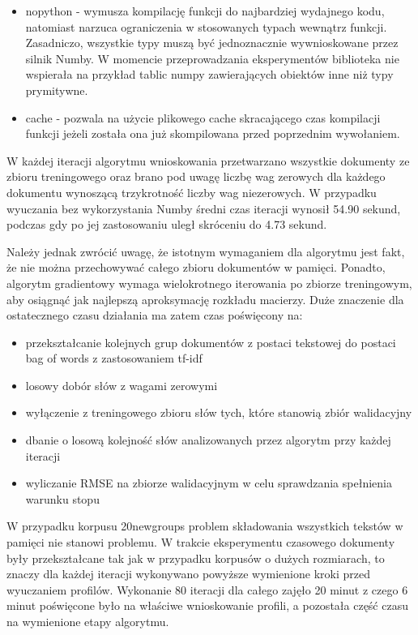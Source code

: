 \documentclass{pracamgr}
\begin{document}
\begin{itemize}
    \item nopython - wymusza kompilację funkcji do najbardziej wydajnego kodu, natomiast narzuca ograniczenia w stosowanych typach wewnątrz funkcji. Zasadniczo, wszystkie typy muszą być jednoznacznie wywnioskowane przez silnik Numby. W momencie przeprowadzania eksperymentów biblioteka nie wspierała na przykład tablic numpy zawierających obiektów inne niż typy prymitywne.
    \item cache - pozwala na użycie plikowego cache skracającego czas kompilacji funkcji jeżeli została ona już skompilowana przed poprzednim wywołaniem.
\end{itemize}

W każdej iteracji algorytmu wnioskowania przetwarzano wszystkie dokumenty ze zbioru treningowego oraz brano pod uwagę liczbę wag zerowych dla każdego dokumentu wynoszącą trzykrotność liczby wag niezerowych. W przypadku wyuczania bez wykorzystania Numby średni czas iteracji wynosił 54.90 sekund, podczas gdy po jej zastosowaniu uległ skróceniu do 4.73 sekund.

Należy jednak zwrócić uwagę, że istotnym wymaganiem dla algorytmu jest fakt, że nie można przechowywać całego zbioru dokumentów w pamięci. Ponadto, algorytm gradientowy wymaga wielokrotnego iterowania po zbiorze treningowym, aby osiągnąć jak najlepszą aproksymację rozkładu macierzy. Duże znaczenie dla ostatecznego czasu działania ma zatem czas poświęcony na:

\begin{itemize}
    \item przekształcanie kolejnych grup dokumentów z postaci tekstowej do postaci bag of words z zastosowaniem tf-idf
    \item losowy dobór słów z wagami zerowymi
    \item wyłączenie z treningowego zbioru słów tych, które stanowią zbiór walidacyjny
    \item dbanie o losową kolejność słów analizowanych przez algorytm przy każdej iteracji
    \item wyliczanie RMSE na zbiorze walidacyjnym w celu sprawdzania spełnienia warunku stopu
\end{itemize}

W przypadku korpusu 20newgroups problem składowania wszystkich tekstów w pamięci nie stanowi problemu. W trakcie eksperymentu czasowego dokumenty były przekształcane tak jak w przypadku korpusów o dużych rozmiarach, to znaczy dla każdej iteracji wykonywano powyższe wymienione kroki przed wyuczaniem profilów. Wykonanie 80 iteracji dla całego zajęło 20 minut z czego 6 minut poświęcone było na właściwe wnioskowanie profili, a pozostała część czasu na wymienione etapy algorytmu.
\end{document}
